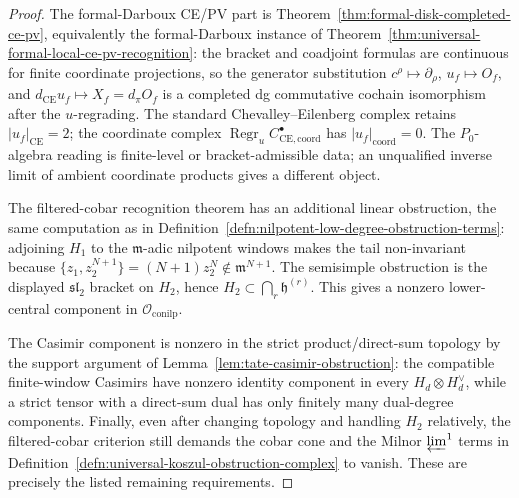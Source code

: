 \begin{proof}
  The formal-Darboux CE/PV part is
  Theorem~\ref{thm:formal-disk-completed-ce-pv}, equivalently the
  formal-Darboux instance of
  Theorem~\ref{thm:universal-formal-local-ce-pv-recognition}: the
  bracket and coadjoint formulas are continuous for finite coordinate
  projections, so the generator substitution
  \(c^\rho\mapsto\partial_\rho\), \(u_f\mapsto O_f\), and
  \(d_{\mathrm{CE}}u_f\mapsto X_f=d_\pi O_f\) is a completed dg
  commutative cochain isomorphism after the \(u\)-regrading.  The
  standard Chevalley--Eilenberg complex retains \(|u_f|_{\mathrm{CE}}=2\);
  the coordinate complex
  \(\operatorname{Regr}_uC^\bullet_{\mathrm{CE},\mathrm{coord}}\)
  has \(|u_f|_{\mathrm{coord}}=0\).  The \(P_0\)-algebra reading is finite-level or
  bracket-admissible data; an unqualified inverse limit of ambient
  coordinate products gives a different object.

  The filtered-cobar recognition theorem has an additional linear
  obstruction, the same computation as in
  Definition~\ref{defn:nilpotent-low-degree-obstruction-terms}:
  adjoining \(H_1\) to the \(\mathfrak m\)-adic nilpotent windows makes
  the tail non-invariant because
  \(\{z_1,z_2^{N+1}\}=(N+1)z_2^N\notin\mathfrak m^{N+1}\).  The
  semisimple obstruction is the displayed \(\mathfrak{sl}_2\) bracket
  on \(H_2\), hence \(H_2\subset\bigcap_r\mathfrak h^{(r)}\).  This
  gives a nonzero lower-central component in
  \(\mathcal O_{\mathrm{conilp}}\).

  The Casimir component is nonzero in the strict product/direct-sum
  topology by the support argument of
  Lemma~\ref{lem:tate-casimir-obstruction}: the compatible
  finite-window Casimirs have nonzero identity component in every
  \(H_d\otimes H_d^\vee\), while a strict tensor with a direct-sum dual
  has only finitely many dual-degree components.  Finally, even after
  changing topology and handling \(H_2\) relatively, the
  filtered-cobar criterion still demands the cobar cone and the Milnor
  \(\varprojlim^1\) terms in
  Definition~\ref{defn:universal-koszul-obstruction-complex} to vanish.
  These are precisely the listed remaining requirements.
\end{proof}

